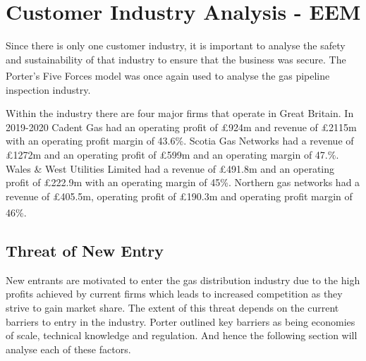 \documentclass[11pt]{article}		%
\newcommand{\supercite}[1]{\textsuperscript{\cite{#1}}}		%
\begin{document}
	\section{Customer Industry Analysis - EEM}

		Since there is only one customer industry, it is important to analyse the safety and sustainability of that industry to ensure that the business was secure.
		The Porter's Five Forces model\supercite{porter2008five} was once again used to analyse the gas pipeline inspection industry.
		
		Within the industry there are four major firms that operate in Great Britain. In 2019-2020 Cadent Gas had an operating profit of £924m and revenue of £2115m with an operating profit margin of 43.6\%. Scotia Gas Networks had a revenue of £1272m and an operating profit of £599m and an operating margin of 47.\%. Wales \& West Utilities Limited had a revenue of £491.8m and an operating profit of £222.9m with an operating margin of 45\%. Northern gas networks had a revenue of £405.5m, operating profit of £190.3m and operating profit margin of 46\%.  \supercite{Gas_Distribution_Industry}
			
		\subsection[Threat of New Entry]{Threat of New Entry}
				New entrants are motivated to enter the gas distribution industry due to the high profits achieved by current firms which leads to increased competition as they strive to gain market share. The extent of this threat depends on the current barriers to entry in the industry. Porter outlined key barriers as being economies of scale, technical knowledge and regulation. And hence the following section will analyse each of these factors. \\
				
\end{document}
